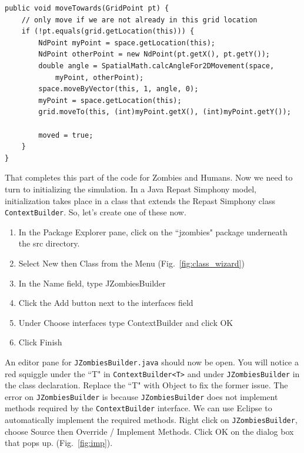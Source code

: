 \documentclass[11pt]{amsart}
\begin{document}
\noindent\begin{minipage}[h]{\textwidth}
\vspace{.2in}
\lstset{language=java,caption=Zombie MovedTowards with Moved}
\begin{lstlisting}
public void moveTowards(GridPoint pt) {
	// only move if we are not already in this grid location
	if (!pt.equals(grid.getLocation(this))) {
		NdPoint myPoint = space.getLocation(this);
		NdPoint otherPoint = new NdPoint(pt.getX(), pt.getY());
		double angle = SpatialMath.calcAngleFor2DMovement(space, 
			myPoint, otherPoint);
		space.moveByVector(this, 1, angle, 0);
		myPoint = space.getLocation(this);
		grid.moveTo(this, (int)myPoint.getX(), (int)myPoint.getY());
		
		moved = true;
	}
}
\end{lstlisting}
\vspace{.2in}
\end{minipage}

That completes this part of the code for Zombies and Humans. Now we need to turn to initializing the simulation. In a Java Repast Simphony model, initialization takes place in a class that extends the Repast Simphony class \texttt{ContextBuilder}. So, let's create one of these now.\\

\begin{enumerate}
\item In the Package Explorer pane, click on the ``jzombies" package underneath the src directory. 
\item Select New then Class from the Menu (Fig.~\ref{fig:class_wizard})
\item In the Name field, type JZombiesBuilder
\item Click the Add button next to the interfaces field
\item Under Choose interfaces type ContextBuilder and click OK
\item Click Finish
\end{enumerate}

\vspace{.2in}
An editor pane for \texttt{JZombiesBuilder.java} should now be open. You will notice a red squiggle under the ``T" in \texttt{ContextBuilder<T>} and under \texttt{JZombiesBuilder} in the class declaration. Replace the ``T" with Object to fix the former issue. The error on \texttt{JZombiesBuilder} is because \texttt{JZombiesBuilder} does not implement methods required by the \texttt{ContextBuilder} interface. We can use Eclipse to automatically implement the required methods. Right click on \texttt{JZombiesBuilder}, choose Source then Override / Implement Methods. Click OK on the dialog box that pops up.  (Fig.~\ref{fig:imp}).
\end{document}
